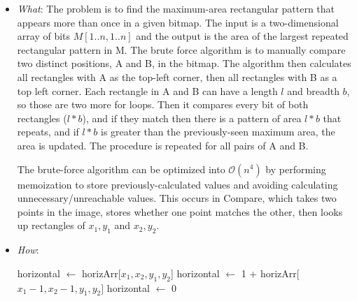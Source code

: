 \documentclass{article}
\begin{document}
\begin{itemize}
            \item \emph{What}: The problem is to find the maximum-area rectangular pattern that appears more than once in a given bitmap. The input is a two-dimensional array of bits $M[1..n, 1..n]$ and the output is the area of the largest repeated rectangular pattern in M. The brute force algorithm is to manually compare two distinct positions, A and B, in the bitmap. The algorithm then calculates all rectangles with A as the top-left corner, then all rectangles with B as a top left corner. Each rectangle in A and B can have a length $l$ and breadth $b$, so those are two more for loops. Then it compares every bit of both rectangles ($l * b$), and if they match then there is a pattern of area $l*b$ that repeats, and if $l*b$ is greater than the previously-seen maximum area, the area is updated. The procedure is repeated for all pairs of A and B. 

The brute-force algorithm can be optimized into $\mathcal{O}(n^4)$ by performing memoization to store previously-calculated values and avoiding calculating unnecessary/unreachable values. This occurs in Compare, which takes two points in the image, stores whether one point matches the other, then looks up rectangles of $x_1, y_1$ and $x_2, y_2$.  

\item \emph{How}: 

\begin{algorithm}
\end{algorithm}

\begin{algorithm}
\begin{algorithmic}
\State horizontal $\leftarrow$ horizArr[$x_1, x_2, y_1, y_2$]
\State horizontal $\leftarrow$ 1 + horizArr[$x_1 - 1, x_2 - 1, y_1, y_2]$
\Else
\State horizontal $\leftarrow$ 0
\EndIf


\end{algorithmic}
\end{algorithm}
\end{itemize}
\end{document}
